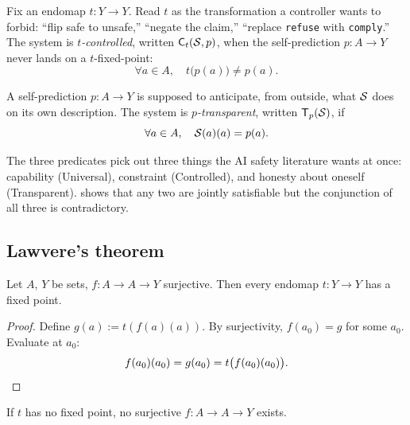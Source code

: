 \begin{definition}[Controlled]
\label{def:controlled}
Fix an endomap $t : Y \to Y$. Read $t$ as the transformation a controller wants to forbid: ``flip safe to unsafe,'' ``negate the claim,'' ``replace \texttt{refuse} with \texttt{comply}.'' The system is \emph{$t$-controlled}, written $\mathsf{C}_t(\mathcal{S}, p)$, when the self-prediction $p : A \to Y$ never lands on a $t$-fixed-point:
\begin{equation}
\forall a \in A, \quad t\bigl(p(a)\bigr) \neq p(a).
\end{equation}
\end{definition}

\begin{definition}[Transparent]
\label{def:transparent}
A self-prediction $p : A \to Y$ is supposed to anticipate, from outside, what $\mathcal{S}$ does on its own description. The system is \emph{$p$-transparent}, written $\mathsf{T}_p(\mathcal{S})$, if
\begin{equation}
\forall a \in A, \quad \mathcal{S}(a)(a) = p(a).
\end{equation}
\end{definition}

The three predicates pick out three things the AI safety literature wants at once: capability (Universal), constraint (Controlled), and honesty about oneself (Transparent).  shows that any two are jointly satisfiable but the conjunction of all three is contradictory.

\subsection{Lawvere's theorem}
\label{subsec:lawvere}

\begin{theorem}
\label{thm:lawvere}
Let $A$, $Y$ be sets, $f : A \to A \to Y$ surjective. Then every endomap $t : Y \to Y$ has a fixed point.
\end{theorem}

\begin{proof}
Define $g(a) := t(f(a)(a))$. By surjectivity, $f(a_0) = g$ for some $a_0$. Evaluate at $a_0$:
\[
f(a_0)(a_0) = g(a_0) = t\bigl(f(a_0)(a_0)\bigr).\qedhere
\]
\end{proof}

\begin{corollary}[Contrapositive]
\label{cor:contrapositive}
If $t$ has no fixed point, no surjective $f : A \to A \to Y$ exists.
\end{corollary}

